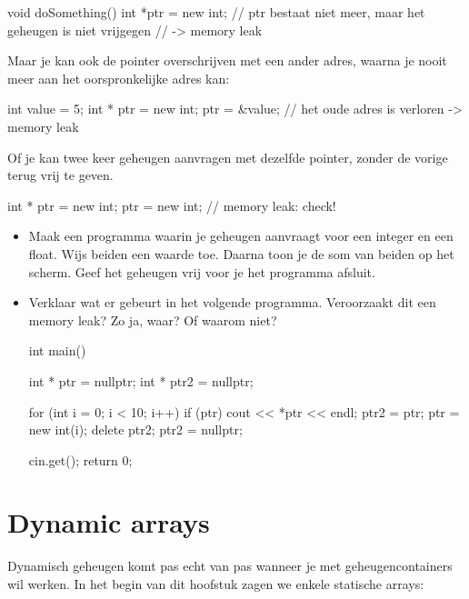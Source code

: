 \documentclass[11pt, oldfontcommands, oneside, a4paper]{memoir}
\begin{document}
\begin{code}
void doSomething()
{
    int *ptr = new int;
}
// ptr bestaat niet meer, maar het geheugen is niet vrijgegen
// -> memory leak
\end{code}

Maar je kan ook de pointer overschrijven met een ander adres, waarna je nooit meer aan het oorspronkelijke adres kan:

\begin{code}
int value = 5;
int * ptr = new int;
ptr = &value; // het oude adres is verloren -> memory leak
\end{code}

Of je kan twee keer geheugen aanvragen met dezelfde pointer, zonder de vorige terug vrij te geven.

\begin{code}
int * ptr = new int;
ptr = new int; // memory leak: check!
\end{code}

\begin{exercise}
	\begin{itemize}
		\item Maak een programma waarin je geheugen aanvraagt voor een integer en een float. Wijs beiden een waarde toe. Daarna toon je de som van beiden op het scherm. Geef het geheugen vrij voor je het programma afsluit.
		
		\item Verklaar wat er gebeurt in het volgende programma. Veroorzaakt dit een memory leak? Zo ja, waar? Of waarom niet?

		\begin{code}
int main()
{
  int * ptr = nullptr;
  int * ptr2 = nullptr;

  for (int i = 0; i < 10; i++) {    
    if (ptr) {
      cout << *ptr << endl;
      ptr2 = ptr;
    }
    ptr = new int(i);
    delete ptr2;
    ptr2 = nullptr;
  }

  cin.get();
  return 0;
}
		\end{code}

	\end{itemize}
\end{exercise}

\section{Dynamic arrays}

Dynamisch geheugen komt pas echt van pas wanneer je met geheugencontainers wil werken. In het begin van dit hoofstuk zagen we enkele statische arrays:
\end{document}
